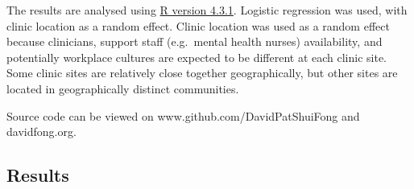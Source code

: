 \documentclass[
  letterpaper,
  DIV=11,
  numbers=noendperiod,
  oneside]{scrartcl}
\begin{document}
The results are analysed using \href{https://www.r-project.org/}{R
version 4.3.1}. Logistic regression was used, with clinic location as a
random effect. Clinic location
was used as a random effect because clinicians, support staff
(e.g.~mental health nurses) availability, and potentially workplace
cultures are expected to be different at each clinic site. Some clinic
sites are relatively close together geographically, but other sites are
located in geographically distinct communities.

Source code can be viewed on www.github.com/DavidPatShuiFong and davidfong.org.

\subsection{Results}\label{results}
\end{document}
